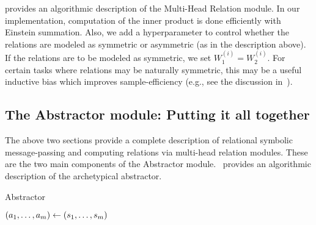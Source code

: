  provides an algorithmic description of the Multi-Head Relation module. In our implementation, computation of the inner product is done efficiently with Einstein summation. Also, we add a hyperparameter to control whether the relations are modeled as symmetric or asymmetric (as in the description above). If the relations are to be modeled as symmetric, we set $W_1^{(i)} = W_2^{(i)}$. For certain tasks where relations may be naturally symmetric, this may be a useful inductive bias which improves sample-efficiency (e.g., see the discussion in~\cite{kerg2022neural}).

\subsection{The Abstractor module: Putting it all together}

The above two sections provide a complete description of relational symbolic message-passing and computing relations via multi-head relation modules. These are the two main components of the Abstractor module.~ provides an algorithmic description of the archetypical abstractor.

\begin{algorithm}[ht!]
	\caption{Abstractor}\label{alg:abstractor}

	\vspace{1em}

	\((a_1, \ldots, a_m) \gets (s_1, \ldots, s_m)\)

\end{algorithm}

